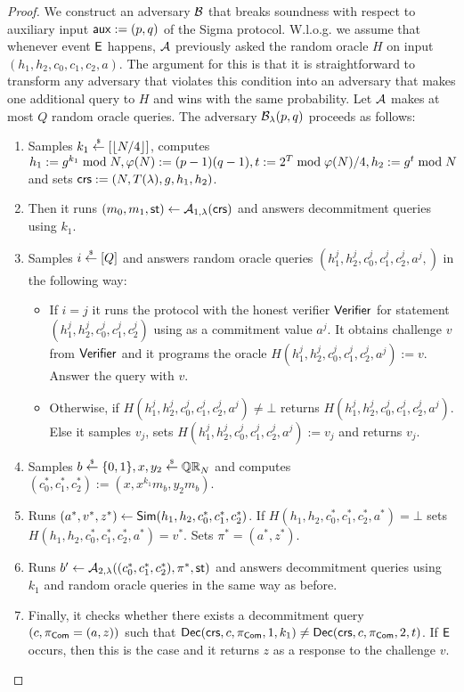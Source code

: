 \begin{proof}
We construct an adversary $\mathcal{B}$ that breaks soundness with respect to auxiliary input $\mathsf{aux}:=(p,q)$ of the Sigma protocol. W.l.o.g. we assume that whenever event $\mathsf{E}$ happens, $\mathcal{A}$ previously asked the random oracle $H$ on input $(h_1,h_2,c_0,c_1,c_2,a)$. The argument for this is that it is straightforward to transform any adversary that violates this condition into an adversary that makes one additional query to $H$ and wins with the same probability. Let $\mathcal{A}$ makes at most $Q$ random oracle queries. 
The adversary $\mathcal{B}_{\lambda}(p,q)$ proceeds as follows:
\vspace{-2mm}
\begin{enumerate}
\item Samples $k_1\stackrel{{\scriptscriptstyle\$}}{\leftarrow} [\left\lfloor N/4 \right\rfloor]$, computes $h_1 := g^{k_1} \bmod N,\varphi(N):=(p-1)(q-1), t:=2^{T} \bmod \varphi(N)/4, h_2:=g^t \bmod N$ and sets $\mathsf{crs}:=(N, T(\lambda), g, h_1, h_2)$. 
\item Then it runs $(m_0, m_1, \mathsf{st}) \leftarrow \mathcal{A}_{1, \lambda}(\mathsf{crs})$ and answers decommitment queries using $k_1$.
\item Samples $i \stackrel{{\scriptscriptstyle\$}}{\leftarrow} [Q]$ and answers random oracle queries $(h_1^j, h_2^j, c_0^j,c_1^j,c_2^j,a^j,)$ in the following way:
\begin{itemize}
\item If $i=j$ it runs the protocol with the honest verifier $\mathsf{Verifier}$ for statement $(h_1^j, h_2^j, c_0^j,c_1^j,c_2^j)$ using as a commitment value $a^j$. It obtains challenge $v$ from $\mathsf{Verifier}$ and it programs the oracle $H(h_1^j, h_2^j,c_0^j,c_1^j,c_2^j,a^j):=v$. Answer the query with $v$.
\item Otherwise, if $H(h_1^j, h_2^j,c_0^j,c_1^j,c_2^j,a^j) \neq \bot$ returns $H(h_1^j, h_2^j,c_0^j,c_1^j,c_2^j,a^j)$. Else it samples $v_j$, sets $H(h_1^j, h_2^j,c_0^j,c_1^j,c_2^j,a^j):=v_j$ and returns $v_j$.
\end{itemize}
\item Samples $b \stackrel{{\scriptscriptstyle\$}}{\leftarrow} \{0,1\}, x, y_2 \stackrel{{\scriptscriptstyle\$}}{\leftarrow} \mathbb{QR}_N$ and computes $(c_0^*, c_1^*, c_2^*):=(x, x^{k_1} m_b,\allowbreak y_2 m_b)$. 
\item Runs $(a^*,v^*,z^*) \leftarrow \mathsf{Sim}(h_1, h_2, c_0^*, c_1^*, c_2^*)$. If $H(h_1, h_2, c_0^*, c_1^*, c_2^*,a^*) = \bot$ sets $H(h_1, h_2, c_0^*, c_1^*, c_2^*,a^*) = v^*$. Sets $\pi^* = (a^*,z^*)$.
\item Runs $b' \leftarrow \mathcal{A}_{2, \lambda}((c_0^*, c_1^*, c_2^*), \pi^*, \mathsf{st})$ and answers decommitment queries using $k_1$ and random oracle queries in the same way as before.
\item Finally, it checks whether there exists a decommitment query $(c, \pi_{\mathsf{Com}}=(a,z))$ such that $\mathsf{Dec}(\mathsf{crs}, c, \pi_{\mathsf{Com}}, 1, k_1) \neq \mathsf{Dec}(\mathsf{crs},c, \pi_{\mathsf{Com}}, 2 ,t)$. If $\mathsf{E}$ occurs, then this is the case and it returns $z$ as a response to the challenge $v$. 
\end{enumerate}


\end{proof}
